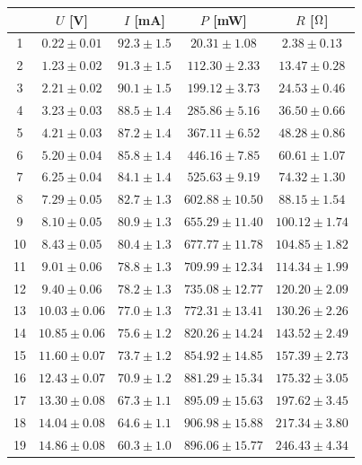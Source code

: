 \begin{table}[!h]
\begin{center}
\begin{tabular}{|c|c|c|c|c|}
\hline
& $U$ [V] & $I$ [mA] & $P$ [mW] & $R$ [$\rm \Omega$] \\
\hline
1	&	$0.22 \pm 0.01$	&	$92.3 \pm 1.5$	&	$20.31 \pm 1.08$	&	$2.38 \pm 0.13$	\\
\hline
2	&	$1.23 \pm 0.02$	&	$91.3 \pm 1.5$	&	$112.30 \pm 2.33$	&	$13.47 \pm 0.28$	\\
\hline
3	&	$2.21 \pm 0.02$	&	$90.1 \pm 1.5$	&	$199.12 \pm 3.73$	&	$24.53 \pm 0.46$	\\
\hline
4	&	$3.23 \pm 0.03$	&	$88.5 \pm 1.4$	&	$285.86 \pm 5.16$	&	$36.50 \pm 0.66$	\\
\hline
5	&	$4.21 \pm 0.03$	&	$87.2 \pm 1.4$	&	$367.11 \pm 6.52$	&	$48.28 \pm 0.86$	\\
\hline
6	&	$5.20 \pm 0.04$	&	$85.8 \pm 1.4$	&	$446.16 \pm 7.85$	&	$60.61 \pm 1.07$	\\
\hline
7	&	$6.25 \pm 0.04$	&	$84.1 \pm 1.4$	&	$525.63 \pm 9.19$	&	$74.32 \pm 1.30$	\\
\hline
8	&	$7.29 \pm 0.05$	&	$82.7 \pm 1.3$	&	$602.88 \pm 10.50$	&	$88.15 \pm 1.54$	\\
\hline
9	&	$8.10 \pm 0.05$	&	$80.9 \pm 1.3$	&	$655.29 \pm 11.40$	&	$100.12 \pm 1.74$	\\
\hline
10	&	$8.43 \pm 0.05$	&	$80.4 \pm 1.3$	&	$677.77 \pm 11.78$	&	$104.85 \pm 1.82$	\\
\hline
11	&	$9.01 \pm 0.06$	&	$78.8 \pm 1.3$	&	$709.99 \pm 12.34$	&	$114.34 \pm 1.99$	\\
\hline
12	&	$9.40 \pm 0.06$	&	$78.2 \pm 1.3$	&	$735.08 \pm 12.77$	&	$120.20 \pm 2.09$	\\
\hline
13	&	$10.03 \pm 0.06$	&	$77.0 \pm 1.3$	&	$772.31 \pm 13.41$	&	$130.26 \pm 2.26$	\\
\hline
14	&	$10.85 \pm 0.06$	&	$75.6 \pm 1.2$	&	$820.26 \pm 14.24$	&	$143.52 \pm 2.49$	\\
\hline
15	&	$11.60 \pm 0.07$	&	$73.7 \pm 1.2$	&	$854.92 \pm 14.85$	&	$157.39 \pm 2.73$	\\
\hline
16	&	$12.43 \pm 0.07$	&	$70.9 \pm 1.2$	&	$881.29 \pm 15.34$	&	$175.32 \pm 3.05$	\\
\hline
17	&	$13.30 \pm 0.08$	&	$67.3 \pm 1.1$	&	$895.09 \pm 15.63$	&	$197.62 \pm 3.45$	\\
\hline
18	&	$14.04 \pm 0.08$	&	$64.6 \pm 1.1$	&	$906.98 \pm 15.88$	&	$217.34 \pm 3.80$	\\
\hline
19	&	$14.86 \pm 0.08$	&	$60.3 \pm 1.0$	&	$896.06 \pm 15.77$	&	$246.43 \pm 4.34$	\\

\end{tabular}
\end{center}
\end{table}

